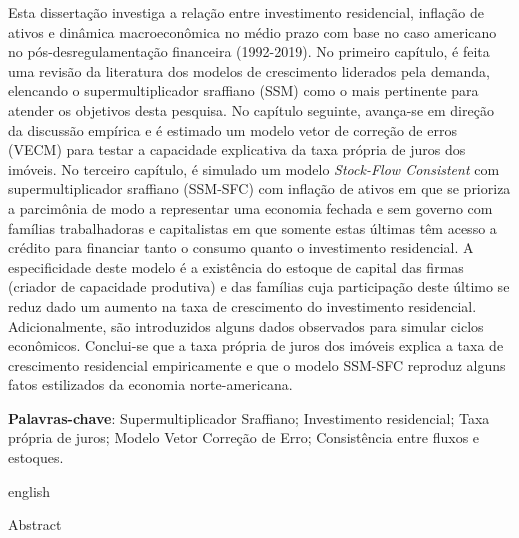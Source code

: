 \documentclass[
12pt,				%
openright,			%
oneside,			%
a4paper,		%
english,			%
brazil,				%
sumario=tradicional,
]{abntex2}
\begin{document}
\begin{resumo}

Esta dissertação investiga a relação entre investimento residencial, inflação de ativos e dinâmica macroeconômica no médio prazo com base no caso americano no pós-desregulamentação financeira (1992-2019).
No primeiro capítulo, é feita uma revisão da literatura dos modelos de crescimento liderados pela demanda, elencando o supermultiplicador sraffiano (SSM) como o mais pertinente para atender os objetivos desta pesquisa.
No capítulo seguinte, avança-se em direção da discussão empírica e é estimado um modelo vetor de correção de erros (VECM) para testar a capacidade explicativa da taxa própria de juros dos imóveis.
No terceiro capítulo, é simulado um modelo \textit{Stock-Flow Consistent} com supermultiplicador sraffiano (SSM-SFC) com inflação de ativos em que se
prioriza a parcimônia de modo a representar uma economia fechada e sem governo com famílias trabalhadoras e capitalistas em que somente estas últimas têm acesso a crédito para financiar tanto o consumo quanto o investimento residencial.
A especificidade deste modelo é a existência do estoque de capital das firmas (criador de capacidade produtiva) e das famílias
cuja participação deste último se reduz dado um aumento na taxa de crescimento do investimento residencial.
Adicionalmente, são introduzidos alguns dados observados para simular ciclos econômicos.
Conclui-se que a taxa própria de juros dos imóveis explica a taxa de crescimento residencial empiricamente e que o modelo SSM-SFC reproduz alguns fatos estilizados da economia norte-americana.



\vspace{\onelineskip}

\noindent\textbf{Palavras-chave}: 
	Supermultiplicador Sraffiano; 
	Investimento residencial; 
	Taxa própria de juros; 
	Modelo Vetor Correção de Erro;
	Consistência entre fluxos e estoques.

\newpage
\begin{otherlanguage*}{english}
	\begin{center}{\ABNTEXchapterfont\huge Abstract}\end{center}
	

\end{otherlanguage*}
\end{resumo}
\end{document}
